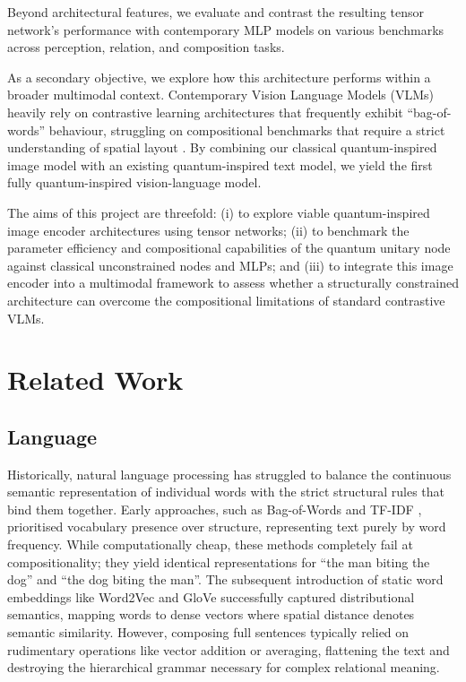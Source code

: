 \documentclass[12pt, a4paper, oneside]{report}
\begin{document}
Beyond architectural features, we evaluate and contrast the resulting tensor network's performance with contemporary MLP models on various benchmarks across perception, relation, and composition tasks.

As a secondary objective, we explore how this architecture performs within a broader multimodal context. Contemporary Vision Language Models (VLMs) heavily rely on contrastive learning architectures\cite{clip} that frequently exhibit ``bag-of-words'' behaviour, struggling on compositional benchmarks that require a strict understanding of spatial layout \cite{aro}. By combining our classical quantum-inspired image model with an existing quantum-inspired text model, we yield the first fully quantum-inspired vision-language model.

The aims of this project are threefold: (i) to explore viable quantum-inspired image encoder architectures using tensor networks; (ii) to benchmark the parameter efficiency and compositional capabilities of the quantum unitary node against classical unconstrained nodes and MLPs; and (iii) to integrate this image encoder into a multimodal framework to assess whether a structurally constrained architecture can overcome the compositional limitations of standard contrastive VLMs.

\chapter{Related Work}

\section{Language}
Historically, natural language processing has struggled to balance the continuous semantic representation of individual words with the strict structural rules that bind them together. Early approaches, such as Bag-of-Words \cite{bow} and TF-IDF \cite{tfidf}, prioritised vocabulary presence over structure, representing text purely by word frequency. While computationally cheap, these methods completely fail at compositionality; they yield identical representations for ``the man biting the dog'' and ``the dog biting the man''. The subsequent introduction of static word embeddings like Word2Vec \cite{word2vec} and GloVe \cite{glove} successfully captured distributional semantics, mapping words to dense vectors where spatial distance denotes semantic similarity. However, composing full sentences typically relied on rudimentary operations like vector addition or averaging, flattening the text and destroying the hierarchical grammar necessary for complex relational meaning.
\end{document}
